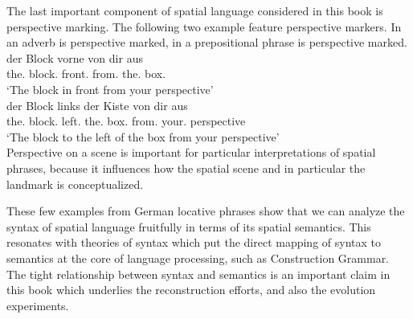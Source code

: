 The last important component of spatial language considered in this book
is perspective marking. The following two example feature perspective markers. In  an adverb is perspective marked, in  a prepositional
phrase is perspective marked.
\ea
\label{e:der-block-vorne-von-dir-aus}
\gll der Block vorne von dir aus\\
the.{\NOM} block.{\NOM} front.{\ADV} from.{\PREP} the.{\DAT} box.{\DAT} \\
\glt `The block in front from your perspective'\\
\z
\ea
\label{e:der-block-links-der-kiste-von-dir-aus}
\gll der Block links der Kiste von dir aus\\
the.{\NOM} block.{\NOM} left.{\PREP} the.{\GEN} box.{\GEN} from.{\PREP} your.{\DAT} perspective\\
\glt `The block to the left of the box from your perspective'\\
\z
Perspective on a scene is important for particular interpretations
of spatial phrases, because it influences how the spatial scene and in 
particular the landmark is conceptualized. 



These few examples from German locative phrases show that 
we can analyze the syntax of spatial language 
fruitfully in terms of its spatial semantics. This resonates with 
theories of syntax which put the direct
mapping of syntax to semantics at the core of language processing, such as Construction Grammar.
The tight relationship between syntax and semantics is an important 
claim in this book which underlies the reconstruction efforts, and also
the evolution experiments. 

